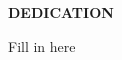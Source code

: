 \newpage
\begin{center}
{\bf DEDICATION}
\end{center}

\phantom{a} 

\phantom{a}

\phantom{a}

\phantom{a}

\phantom{a}

\phantom{a}

\phantom{a}

\phantom{a}

\phantom{a}

\phantom{a}

{\it 
\centering 

Fill in here

}
